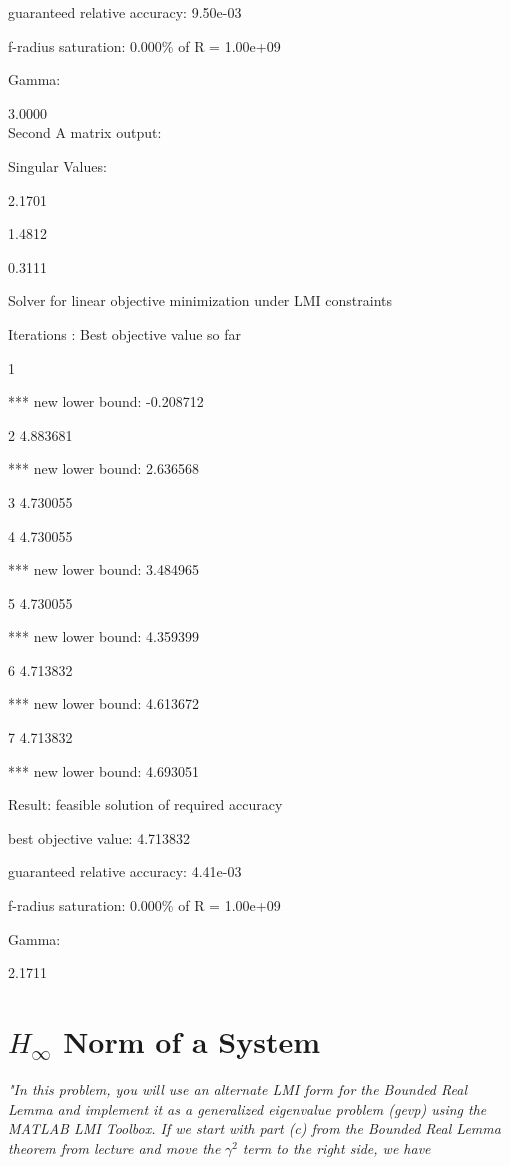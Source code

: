\documentclass[12pt, letterpaper]{article}
\begin{document}
 guaranteed relative accuracy:  9.50e-03

 f-radius saturation:  0.000\% of R =  1.00e+09 
 
Gamma: 

    3.0000 \\

Second A matrix output:

Singular Values: 

2.1701

1.4812

0.3111


 Solver for linear objective minimization under LMI constraints 

 Iterations   :    Best objective value so far 
 
     1

     ***                 new lower bound:    -0.208712

2                   4.883681

     ***                 new lower bound:     2.636568

3                   4.730055

     4                   4.730055

     ***                 new lower bound:     3.484965

5                   4.730055

     ***                 new lower bound:     4.359399

6                   4.713832

     ***                 new lower bound:     4.613672

7                   4.713832

     ***                 new lower bound:     4.693051

 Result:  feasible solution of required accuracy

 best objective value:     4.713832

          guaranteed relative accuracy:  4.41e-03

          f-radius saturation:  0.000\% of R =  1.00e+09 
 
Gamma: 

    2.1711

\section{$H_\infty$ Norm of a System}

\textit{"In this problem, you will use an alternate LMI form for the Bounded Real Lemma and implement it as a generalized eigenvalue problem (gevp) using the MATLAB LMI Toolbox. If we start with part (c) from the Bounded Real Lemma theorem from lecture and move the }$\gamma^2$\textit{ term to the right side, we have}
\end{document}
